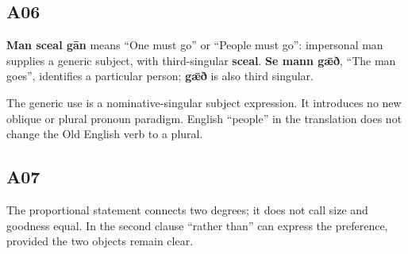 \subsection*{A06}

\par\begin{minipage}{\linewidth}\raggedright
\textbf{Man sceal gān} means “One must go” or “People must go”: impersonal man supplies a generic subject, with third-singular \textbf{sceal}. \textbf{Se mann gǣð}, “The man goes”, identifies a particular person; \textbf{gǣð} is also third singular.

The generic use is a nominative-singular subject expression. It introduces no new oblique or plural pronoun paradigm. English “people” in the translation does not change the Old English verb to a plural.

\end{minipage}\par\addvspace{4pt}

\subsection*{A07}

\par\begin{minipage}{\linewidth}\raggedright



The proportional statement connects two degrees; it does not call size and goodness equal. In the second clause “rather than” can express the preference, provided the two objects remain clear.

\end{minipage}\par\addvspace{4pt}

